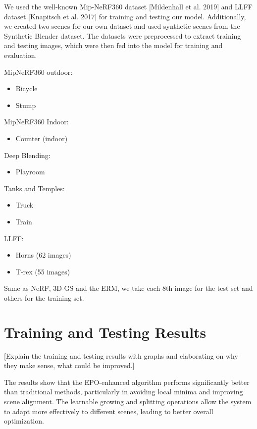 \documentclass[11pt]{report}
\begin{document}
We used the well-known Mip-NeRF360 dataset [Mildenhall et al. 2019] and LLFF dataset [Knapitsch et al. 2017] for training and testing our model. Additionally, we created two scenes for our own dataset and used synthetic scenes from the Synthetic Blender dataset. The datasets were preprocessed to extract training and testing images, which were then fed into the model for training and evaluation.

MipNeRF360 outdoor:
\begin{itemize}
    \item Bicycle 
    \item Stump
\end{itemize}

MipNeRF360 Indoor:
\begin{itemize}
    \item Counter (indoor)
\end{itemize}

Deep Blending:
\begin{itemize}
    \item Playroom
\end{itemize}

Tanks and Temples:
\begin{itemize}
    \item Truck
    \item Train
\end{itemize}

LLFF:
\begin{itemize}
    \item Horns (62 images)
    \item T-rex (55 images)
\end{itemize}

Same as NeRF, 3D-GS and the ERM, we take each 8th image for the test set and others for the training set.

\section{Training and Testing Results}
[Explain the training and testing results with graphs and elaborating on why they make sense, what could be improved.]

The results show that the EPO-enhanced algorithm performs significantly better than traditional methods, particularly in avoiding local minima and improving scene alignment. The learnable growing and splitting operations allow the system to adapt more effectively to different scenes, leading to better overall optimization.
\end{document}
